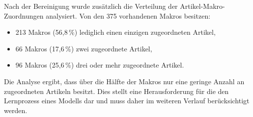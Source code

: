 Nach der Bereinigung wurde zusätzlich die Verteilung der Artikel-Makro-Zuordnungen analysiert. Von den 375 vorhandenen Makros besitzen:

\begin{itemize} 
    \item 213 Makros (56,8\,\%) lediglich einen einzigen zugeordneten Artikel, 
    \item 66 Makros (17,6\,\%) zwei zugeordnete Artikel,
    \item 96 Makros (25,6\,\%) drei oder mehr zugeordnete Artikel.
\end{itemize} 

Die Analyse ergibt, dass über die Hälfte der Makros nur eine geringe Anzahl an zugeordneten Artikeln besitzt. 
Dies stellt eine Herausforderung für die den Lernprozess eines Modells dar und muss daher im weiteren Verlauf berücksichtigt werden.


 


        

